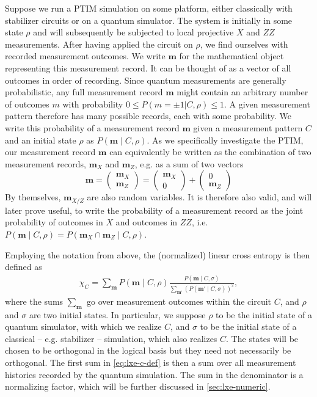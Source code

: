 Suppose we run a PTIM simulation on some platform, either classically with
stabilizer circuits or on a quantum simulator. The system is initially in some
state $\rho$ and will subsequently be subjected to local projective $X$ and
$ZZ$ measurements.  After having applied the circuit on $\rho$, we find
ourselves with recorded measurement outcomes. We write $\mathbf{m}$ for the
mathematical object representing this measurement record. It can be
thought of as a vector of all outcomes in order of recording.
Since quantum measurements are generally probabilistic, any full
measurement record $\mathbf{m}$ might contain an arbitrary number of outcomes
$m$ with probability $0\leq P(m=\pm 1 | C, \rho)\leq 1$. A given
measurement pattern therefore has many possible records, each with some
probability.  We write this probability of a measurement record $\mathbf{m}$
given a measurement pattern $C$ and an initial state $\rho$ as $P(\mathbf{m}
\mid C, \rho)$. As we specifically investigate the PTIM, our measurement record
$\mathbf{m}$ can equivalently be written as the combination of two measurement
records, $\mathbf{m}_X$ and $\mathbf{m}_{Z}$, e.g. as a sum of two vectors
\[
  \mathbf{m} = \begin{pmatrix} \mathbf{m}_X \\ \mathbf{m}_Z \end{pmatrix} 
  = \begin{pmatrix} \mathbf{m}_X \\ 0 \end{pmatrix} + \begin{pmatrix}
0 \\ \mathbf{m}_Z \end{pmatrix} 
\]
By themselves, $\mathbf{m}_{X/Z}$ are also random variables.
It is therefore also valid, and will later prove useful, to
write the probability of a measurement record as the joint probability of
outcomes in $X$ and outcomes in $ZZ$, i.e.  $P\left(\mathbf{m} \mid C,
\rho\right) = P\left(\mathbf{m}_X\cap \mathbf{m}_Z\mid C,\rho\right)$.

Employing the notation from above, the (normalized) linear cross entropy is
then defined as \cite{liCrossEntropyBenchmark2023}
\begin{align}\label{eq:lxe-c-def}
  \chi_C = \sum_{\mathbf{m}} P(\mathbf{m} \mid C, \rho) \frac{P(\mathbf{m} \mid
    C, \sigma)}{\sum_{\mathbf{m}'}\left(P(\mathbf{m}' \mid
    C, \sigma)\right)^2}
,\end{align}
where the sums $\sum_\mathbf{m}$ go over measurement outcomes
within the circuit $C$, and $\rho$ and $\sigma$ are two initial
states. In particular, we suppose $\rho$ to be the initial state of a quantum
simulator, with which we realize $C$, and $\sigma$ to be the initial state of a
classical -- e.g. stabilizer -- simulation, which also realizes $C$. The
states will be chosen to be orthogonal in the logical basis 
but they need not necessarily be orthogonal. 
The first sum in \cref{eq:lxe-c-def} is then a sum over all measurement
histories recorded by the quantum simulation. The sum in the denominator is a
normalizing factor, which will be further discussed in \cref{sec:lxe-numeric}.

